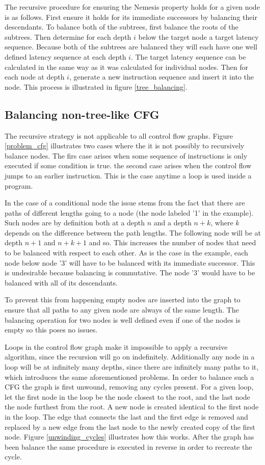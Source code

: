 \documentclass{article}
\begin{document}
The recursive procedure for ensuring the Nemesis property holds for a given node is as follows. First ensure it holds for its immediate successors by balancing their descendants. 
To balance both of the subtrees, first balance the roots of the subtrees. Then determine for each depth $i$ below the target node a target latency sequence. 
Because both of the subtrees are balanced they will each have one well defined latency sequence at each depth $i$. The target latency sequence can be calculated 
in the same way as it was calculated for individual nodes. Then for each node at depth $i$, generate a new instruction sequence 
and insert it into the node.   This process is illustrated in figure \ref{tree_balancing}. 

\subsection{Balancing non-tree-like CFG}
The recursive strategy is not applicable to all control flow graphs. Figure \ref{problem_cfg} illustrates two cases where the it is not possibly to recursively balance nodes. The firs case arises when 
some sequence of instructions is only executed if some condition is true. the second case arises when the control flow jumps to an earlier instruction. This is the case anytime a loop is used inside a program. 

In the case of a conditional node the issue stems from the fact that there are paths of different lengths going to a node (the node labeled '1' in the example). Such nodes are by definition both at a depth $n$ and 
a depth $n+k$, where $k$ depends on the difference between the path lengths. The following node will be at depth $n+1$ and $n+k+1$ and so. This increases the number of nodes that need to be balanced with respect to each other.
As is the case in the example, each node below node '3' will have to be balanced with its immediate successor. This is undesirable because balancing is commutative. The node '3' would have to be balanced with all of its descendants.

To prevent this from happening empty nodes are inserted into the graph to ensure that all paths to any given node are always of the same length. The balancing operation for two nodes is well 
defined even if one of the nodes is empty so this poses no issues. 

Loops in the control flow graph make it impossible to apply a recursive algorithm, since the recursion will go on indefinitely. Additionally any node in a loop will be at infinitely many depths, since there are infinitely many paths to it,
which introduces the same aforementioned problems. In order to balance such a CFG the graph is first unwound, removing any cycles present. 
For a given loop, let the first node in the loop be the node closest to the root, and the last node the node furthest from the root. A new node is created identical to the first node in the loop. 
The edge that connects the last and the first edge is removed and replaced by a new edge from the last node to the newly created copy of the first node. Figure \ref{unwinding_cycles} illustrates how this works. 
After the graph has been balance the same procedure is executed in reverse in order to recreate the cycle. 
\end{document}
